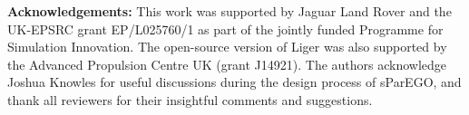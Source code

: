 \documentclass{llncs}
\begin{document}
\vspace{2mm}

\textbf{Acknowledgements: }This work was supported by Jaguar Land Rover and the UK-EPSRC grant EP/L025760/1 as part of the jointly funded Programme for Simulation Innovation. The open-source version of Liger was also supported by the Advanced Propulsion Centre UK (grant J14921). The authors acknowledge Joshua Knowles for useful discussions during the design process of sParEGO, and thank all reviewers for their insightful comments and suggestions.

\small{


}
\end{document}

